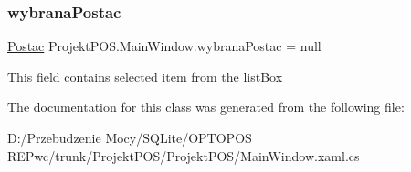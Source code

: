 \mbox{\label{class_projekt_p_o_s_1_1_main_window_ad0cd50357b42ca42fed4b16ba859c645}} 
\subsubsection{\texorpdfstring{wybrana\+Postac}{wybranaPostac}}
{\footnotesize\ttfamily \hyperlink{class_projekt_p_o_s_1_1_postac}{Postac} Projekt\+P\+O\+S.\+Main\+Window.\+wybrana\+Postac = null\hspace{0.3cm}{\ttfamily [private]}}



This field contains selected item from the list\+Box 



The documentation for this class was generated from the following file\+:\begin{DoxyCompactItemize}
\item 
D\+:/\+Przebudzenie Mocy/\+S\+Q\+Lite/\+O\+P\+T\+O\+P\+O\+S R\+E\+Pwc/trunk/\+Projekt\+P\+O\+S/\+Projekt\+P\+O\+S/Main\+Window.\+xaml.\+cs\end{DoxyCompactItemize}
